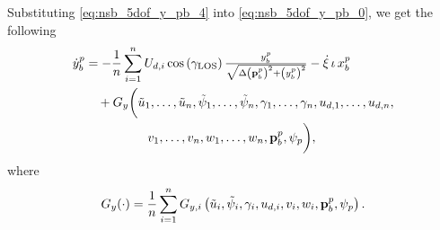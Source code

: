 \noindent Substituting \eqref{eq:nsb_5dof_y_pb_4} into \eqref{eq:nsb_5dof_y_pb_0}, we get the following
\begin{equation}
    \begin{split}
        \dot{y}_b^p &= - \frac{1}{n}\sum_{i=1}^n U_{d,i}\cos\left(\gamma_{\rm LOS}\right)\scale[1]{\frac{y_b^p}{\sqrt{\Delta\left(\mat{p}_b^p\right)^2 + \left(y_b^p\right)^2}}} - \dot{\xi}\,\iota\,x_b^p \\
        &\quad + G_y\bigg(\tilde{u}_1, \ldots, \tilde{u}_n, \tilde{\psi}_1, \ldots, \tilde{\psi}_n, \gamma_1, \ldots, \gamma_n, u_{d,1}, \ldots, u_{d,n}, \\
        & \qquad \qquad \quad v_1, \ldots, v_n, w_1, \ldots, w_n, \mat{p}_b^p, \psi_p\bigg),
    \end{split}
\end{equation}
where
\begin{equation}
    G_y(\cdot) = \frac{1}{n} \sum_{i=1}^n G_{y,i}\left(\tilde{u}_i, \tilde{\psi}_i, \gamma_i, u_{d,i}, v_i, w_i, \mathbf{p}_b^p, \psi_p\right).
\end{equation}

